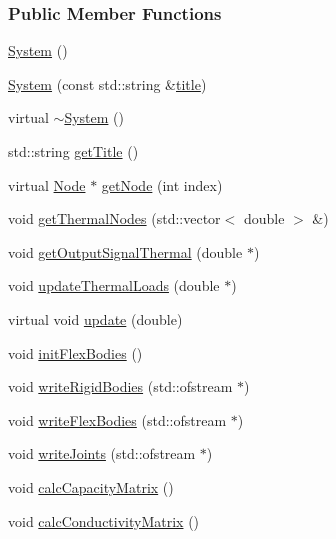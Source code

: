 \subsubsection*{Public Member Functions}
\begin{DoxyCompactItemize}
\item 
\hyperlink{classmknix_1_1_system_ac1dd2687f5f064df189533aded56583c}{System} ()
\item 
\hyperlink{classmknix_1_1_system_acd21c81295d045c5a2da9116edcf3007}{System} (const std\+::string \&\hyperlink{classmknix_1_1_system_a2dcd01381b3eec7b2e8e2c1c3ab38972}{title})
\item 
virtual \hyperlink{classmknix_1_1_system_a2edabe7efbc4e1c07efe75e635f3469d}{$\sim$\+System} ()
\item 
std\+::string \hyperlink{classmknix_1_1_system_a5315a33bb61855c178110b2998783ee3}{get\+Title} ()
\item 
virtual \hyperlink{classmknix_1_1_node}{Node} $\ast$ \hyperlink{classmknix_1_1_system_a34b9f15c3ce73ae788cc00f427bee866}{get\+Node} (int index)
\item 
void \hyperlink{classmknix_1_1_system_af703eb66f164684e551a510ba7caf17d}{get\+Thermal\+Nodes} (std\+::vector$<$ double $>$ \&)
\item 
void \hyperlink{classmknix_1_1_system_a306f75a65b0c8dfb70f75dddfd31982b}{get\+Output\+Signal\+Thermal} (double $\ast$)
\item 
void \hyperlink{classmknix_1_1_system_afc0008395a87621eaf136c59798d4b01}{update\+Thermal\+Loads} (double $\ast$)
\item 
virtual void \hyperlink{classmknix_1_1_system_a78adb69ca95553f0a91d9559020ad7ae}{update} (double)
\item 
void \hyperlink{classmknix_1_1_system_a13e973528d37b0b61a598e4abcf78a74}{init\+Flex\+Bodies} ()
\item 
void \hyperlink{classmknix_1_1_system_a848d086b44d1a4d656cb6357a738188b}{write\+Rigid\+Bodies} (std\+::ofstream $\ast$)
\item 
void \hyperlink{classmknix_1_1_system_aa68577edc1818bbe8d4bd9b6f716b5de}{write\+Flex\+Bodies} (std\+::ofstream $\ast$)
\item 
void \hyperlink{classmknix_1_1_system_a87f850673f20e791e815f182190806c1}{write\+Joints} (std\+::ofstream $\ast$)
\item 
void \hyperlink{classmknix_1_1_system_a062011eba2b5bd9399705f9e725af4e8}{calc\+Capacity\+Matrix} ()
\item 
void \hyperlink{classmknix_1_1_system_a0336b3ae44843b0f48d1490072a6fb5f}{calc\+Conductivity\+Matrix} ()

\end{DoxyCompactItemize}
